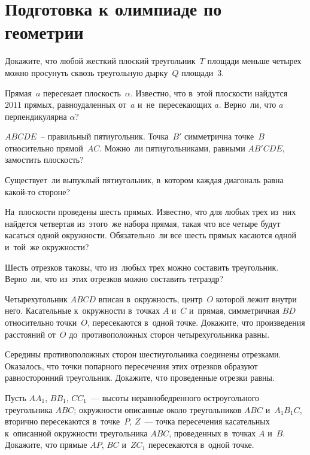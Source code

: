 
\section*{Подготовка к олимпиаде по геометрии}

\begin{problems}

\item
Докажите, что любой жесткий плоский треугольник~$T$ площади меньше четырех
можно просунуть сквозь треугольную дырку~$Q$ площади~$3$.

\item
Прямая~$a$ пересекает плоскость~$\alpha$.
Известно, что в~этой плоскости найдутся $2011$ прямых, равноудаленных от~$a$
и~не~пересекающих $a$.
Верно~ли, что $a$ перпендикулярна $\alpha$?

\item
$ABCDE$~-- правильный пятиугольник.
Точка~$B'$ симметрична точке~$B$ относительно прямой~$AC$.
Можно~ли пятиугольниками, равными $AB'CDE$, замостить плоскость?

\item
Существует~ли выпуклый пятиугольник, в~котором каждая диагональ равна какой-то
стороне?

\item
На~плоскости проведены шесть прямых.
Известно, что для любых трех из~них найдется четвертая из~этого~же набора
прямая, такая что все четыре будут касаться одной окружности.
Обязательно~ли все шесть прямых касаются одной и~той~же окружности?

\item
Шесть отрезков таковы, что из~любых трех можно составить треугольник.
Верно~ли, что из~этих отрезков можно составить тетраэдр?

\item
Четырехугольник $ABCD$ вписан в~окружность, центр~$O$ которой лежит внутри
него.
Касательные к~окружности в~точках $A$ и~$C$ и~прямая, симметричная $BD$
относительно точки~$O$, пересекаются в~одной точке.
Докажите, что произведения расстояний от~$O$ до~противоположных сторон
четырехугольника равны.

\item
Середины противоположных сторон шестиугольника соединены отрезками.
Оказалось, что точки попарного пересечения этих отрезков образуют
равносторонний треугольник.
Докажите, что проведенные отрезки равны.

\item
Пусть $A A_1$, $B B_1$, $C C_1$~--- высоты неравнобедренного остроугольного
треугольника $ABC$;
окружности описанные около треугольников $ABC$ и~$A_1 B_1 C$, вторично
пересекаются в~точке~$P$, $Z$~--- точка пересечения касательных к~описанной
окружности треугольника $ABC$, проведенных в~точках $A$ и~$B$.
Докажите, что прямые $AP$, $BC$ и~$Z C_1$ пересекаются в~одной точке.

\end{problems}


